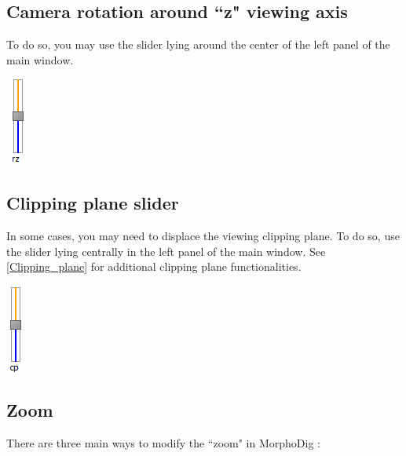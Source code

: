 \subsection{Camera rotation around ``z" viewing axis}

\begin{minipage}{0.7\textwidth}
To do so, you may use the slider lying around the center of the left panel of the main window.
\end{minipage}    
\begin{minipage}{0.25\textwidth}\centering
  \includegraphics[scale=0.7]{images/06/camera/rz_cam.png}
 \end{minipage}    



\subsection{Clipping plane slider}

\begin{minipage}{0.7\textwidth}
In some cases, you may need to displace the viewing clipping plane. To do so, use
the slider lying centrally in the left panel of the main window. See \ref{Clipping_plane} for additional clipping plane functionalities.\\

\end{minipage}    
\begin{minipage}{0.25\textwidth}\centering
  \includegraphics[scale=0.5]{images/06/camera/cp_slider.png}
 \end{minipage}   




\subsection{Zoom}
There are three main ways to modify the ``zoom" in MorphoDig :


